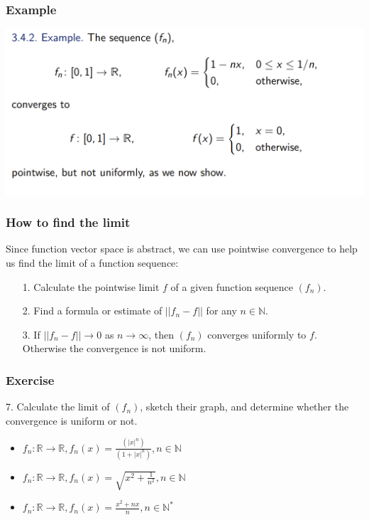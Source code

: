 \documentclass{beamer}
\begin{document}
\begin{frame}
    \frametitle{Example}
    \centering
    \includegraphics[width=1\textwidth]{seq_of_func.png}
\end{frame}
\begin{frame}
    \frametitle{How to find the limit}
    \hspace{1em}
    Since function vector space is abstract, we can use pointwise convergence
    to help us find the limit of a function sequence:\\
    \vspace{1em}
    \begin{itemize}
        \item [1.]Calculate the pointwise limit $f$ of a given function sequence $(f_n)$.
        \item [2.] Find a formula or estimate of $||f_n - f||$ for any $ n \in \mathbb{N} $.
        \item [3.] If $||f_n - f|| \to 0$ as $n \to \infty$, then $(f_n)$ converges uniformly to $f$.
              Otherwise the convergence is not uniform.
    \end{itemize}

\end{frame}
\begin{frame}
    \frametitle{Exercise}
    7. Calculate the limit of $(f_n)$, sketch their graph, and
    determine whether the convergence is uniform or not.
    \begin{itemize}
        \item   $f_n:\mathbb{R}\to \mathbb{R}, f_n (x)=\frac{(|x|^n)}{(1+|x|^n )}, n \in \mathbb{N}$\\
              \vspace{1em}
        \item  $f_n:\mathbb{R}\to \mathbb{R},f_n (x)=\sqrt{x^2+\frac{1}{n^2}}, n \in \mathbb{N} $
              \vspace{1em}
        \item $f_n: \mathbb{R} \to \mathbb{R}, f_n (x)=\frac{x^2+n x}{n}, n \in \mathbb{N}^*$
    \end{itemize}
\end{frame}
\end{document}
